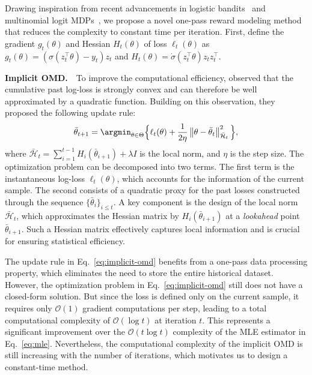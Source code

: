 Drawing inspiration from recent advancements in logistic bandits~\citep{AISTATS'22:Faury-Jointly, NeurIPS'23:MLogB} and multinomial logit MDPs~\citep{NeurIPS'24:MNLmdp}, we propose a novel one-pass reward modeling method that reduces the complexity to constant time per iteration. First, define the gradient $g_t(\theta)$ and Hessian $H_t(\theta)$ of loss $\ell_t(\theta)$ as $g_t(\theta) = (\sigma(z_t^{\top} \theta)-y_t) z_t$ and $H_t(\theta) = \dot{\sigma}(z_t^{\top} \theta) z_t z_t^{\top}$.


\textbf{Implicit OMD.}~~To improve the computational efficiency, \citet{AISTATS'22:Faury-Jointly} observed that the cumulative past log-loss is strongly convex and can therefore be well approximated by a quadratic function. Building on this observation, they proposed the following update rule:
\begin{align}
  \label{eq:implicit-omd}
  \bar{\theta}_{t+1}=\argmin_{\theta \in \Theta} \Big\{\ell_t(\theta)+\frac{1}{2 \eta}\left\|\theta-\bar{\theta}_t\right\|_{\bar{\mathcal{H}}_t}^2\Big\},
\end{align}
where $\bar{\mathcal{H}}_t=\sum_{i=1}^{t-1} H_i\left(\bar{\theta}_{i+1}\right)+\lambda I$ is the local norm, and $\eta$ is the step size. The optimization problem can be decomposed into two terms. The first term is the instantaneous log-loss $\ell_{t}(\theta)$, which accounts for the information of the current sample. The second consists of a quadratic proxy for the past losses constructed through the sequence $\{\bar{\theta}_{i}\}_{i\leq t}$. A key component is the design of the local norm $\bar{\mathcal{H}}_t$, which approximates the Hessian matrix by $H_i\left(\bar{\theta}_{i+1}\right)$ at a \emph{lookahead} point $\bar{\theta}_{i+1}$. Such a Hessian matrix effectively captures local information and is crucial for ensuring statistical efficiency.

The update rule in Eq.~\eqref{eq:implicit-omd} benefits from a one-pass data processing property, which eliminates the need to store the entire historical dataset. However, the optimization problem in Eq.~\eqref{eq:implicit-omd} still does not have a closed-form solution. But since the loss is defined only on the current sample, it requires only $\mathcal{O}(1)$ gradient computations per step, leading to a total computational complexity of $\mathcal{O}(\log t)$ at iteration $t$. This represents a significant improvement over the $\mathcal{O}(t \log t)$ complexity of the MLE estimator in Eq.~\eqref{eq:mle}. Nevertheless, the computational complexity of the implicit OMD is still increasing with the number of iterations, which motivates us to design a constant-time method.

